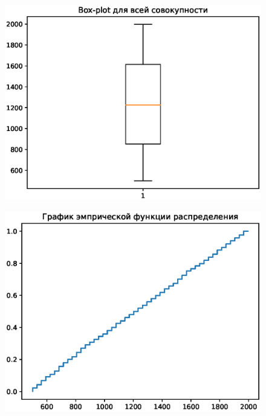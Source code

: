 \documentclass{article}
\begin{document}
\begin{figure}[!h]
\begin{center}
\includegraphics [scale=0.4]{images/box1.eps}
\end{center}
\end{figure}

\begin{figure}[!t]
\begin{center}
\includegraphics [scale=0.4]{images/ecdf2.eps}
\end{center}
\end{figure}
\end{document}
